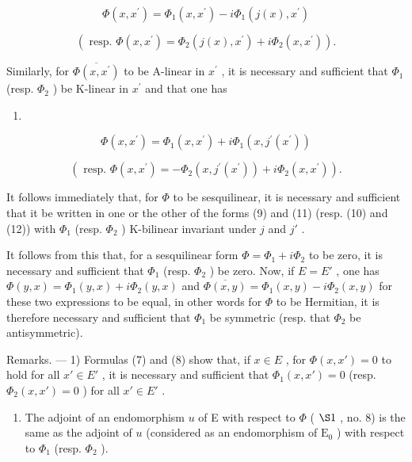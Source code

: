 \[
\Phi (x, x ^ {\prime}) = \Phi_ {1} (x, x ^ {\prime}) - i \Phi_ {1} (j (x), x ^ {\prime})\tag{10}
\]

\[
(\text { resp. } \Phi (x, x ^ {\prime}) = \Phi_ {2} (j (x), x ^ {\prime}) + i \Phi_ {2} (x, x ^ {\prime})).
\]

Similarly, for \(\overline{\Phi(x,x^{\prime})}\) to be A-linear in \(x^{\prime}\) , it is necessary and sufficient that \(\Phi_{1}\) (resp. \(\Phi_{2}\) ) be K-linear in \(x^{\prime}\) and that one has

\begin{enumerate}
\def\labelenumi{(\arabic{enumi})}
\setcounter{enumi}{10}
\tightlist
\item
\end{enumerate}

\[
\Phi (x, x ^ {\prime}) = \Phi_ {1} (x, x ^ {\prime}) + i \Phi_ {1} (x, j ^ {\prime} (x ^ {\prime}))\tag{12}
\]

\[
(\text { resp. } \Phi (x, x ^ {\prime}) = - \Phi_ {2} (x, j ^ {\prime} (x ^ {\prime})) + i \Phi_ {2} (x, x ^ {\prime})).
\]

It follows immediately that, for \(\Phi\) to be sesquilinear, it is necessary and sufficient that it be written in one or the other of the forms (9) and (11) (resp. (10) and (12)) with \(\Phi_{1}\) (resp. \(\Phi_{2}\) ) K-bilinear invariant under \(j\) and \(j'\) .

It follows from this that, for a sesquilinear form \(\Phi = \Phi_{1} + i\Phi_{2}\) to be zero, it is necessary and sufficient that \(\Phi_{1}\) (resp. \(\Phi_{2}\) ) be zero. Now, if \(E = E'\) , one has \(\Phi(y, x) = \Phi_{1}(y, x) + i\Phi_{2}(y, x)\) and \(\overline{\Phi(x, y)} = \Phi_{1}(x, y) - i\Phi_{2}(x, y)\) for these two expressions to be equal, in other words for \(\Phi\) to be Hermitian, it is therefore necessary and sufficient that \(\Phi_{1}\) be symmetric (resp. that \(\Phi_{2}\) be antisymmetric).

Remarks. --- 1) Formulas (7) and (8) show that, if \(x \in E\) , for \(\Phi(x, x') = 0\) to hold for all \(x' \in E'\) , it is necessary and sufficient that \(\Phi_1(x, x') = 0\) (resp. \(\Phi_2(x, x') = 0\) ) for all \(x' \in E'\) .

\begin{enumerate}
\def\labelenumi{\arabic{enumi})}
\setcounter{enumi}{1}
\tightlist
\item
  The adjoint of an endomorphism \(u\) of E with respect to \(\Phi\) ( \(\S 1\) , no. 8) is the same as the adjoint of \(u\) (considered as an endomorphism of \(\mathrm{E}_{0}\) ) with respect to \(\Phi_{1}\) (resp. \(\Phi_{2}\) ).
\end{enumerate}

